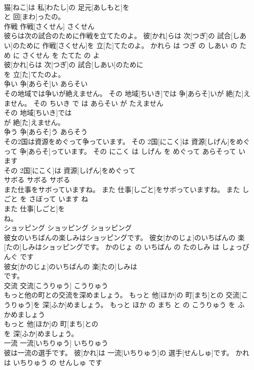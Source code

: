 \documentclass[8pt]{extreport}
\begin{document}
\begin{CJK}{UTF8}{min}
\\	猫[ねこ]は 私[わたし]の 足元[あしもと]を
\\	と 回[まわ]ったの。			
\\	作戦	作戦[さくせん]	さくせん	
\\	彼らは次の試合のために作戦を立てたのよ。	彼[かれ]らは 次[つぎ]の 試合[しあい]のために 作戦[さくせん]を 立[た]てたのよ。	かれら は つぎ の しあい の ため に さくせん を たてた の よ	
\\	彼[かれ]らは 次[つぎ]の 試合[しあい]のために
\\	を 立[た]てたのよ。			
\\	争い	争[あらそ]い	あらそい	
\\	その地域では争いが絶えません。	その 地域[ちいき]では 争[あらそ]いが 絶[た]えません。	その ちいき で は あらそい が たえません	
\\	その 地域[ちいき]では
\\	が 絶[た]えません。			
\\	争う	争[あらそ]う	あらそう	
\\	その2国は資源をめぐって争っています。	その 2国[にこく]は 資源[しげん]をめぐって 争[あらそ]っています。	その にこく は しげん を めぐって あらそって います	
\\	その 2国[にこく]は 資源[しげん]をめぐって
\\	サボる	サボる	サボる	
\\	また仕事をサボっていますね。	また 仕事[しごと]をサボっていますね。	また しごと を さぼって います ね	
\\	また 仕事[しごと]を
\\	ね。			
\\	ショッピング	ショッピング	ショッピング	
\\	彼女のいちばんの楽しみはショッピングです。	彼女[かのじょ]のいちばんの 楽[たの]しみはショッピングです。	かのじょ の いちばん の たのしみ は しょっぴんぐ です	
\\	彼女[かのじょ]のいちばんの 楽[たの]しみは
\\	です。			
\\	交流	交流[こうりゅう]	こうりゅう	
\\	もっと他の町との交流を深めましょう。	もっと 他[ほか]の 町[まち]との 交流[こうりゅう]を 深[ふか]めましょう。	もっと ほか の まち と の こうりゅう を ふかめましょう	
\\	もっと 他[ほか]の 町[まち]との
\\	を 深[ふか]めましょう。			
\\	一流	一流[いちりゅう]	いちりゅう	
\\	彼は一流の選手です。	彼[かれ]は 一流[いちりゅう]の 選手[せんしゅ]です。	かれ は いちりゅう の せんしゅ です	

\end{CJK}
\end{document}

